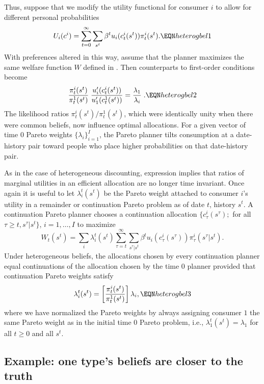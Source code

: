 Thus, suppose that we modify  the utility functional  for consumer $i$
to allow for different personal probabilities
$$ U_i(c^i) = \sum_{t=0}^\infty \sum_{s^t} \beta^t u_i(c^i_t(s^t))
\pi_t^i(s^t) .  \EQN heterogbel1 $$
With preferences altered in this way, assume that the planner
maximizes the same welfare function $W$ defined in .    Then  counterparts to first-order conditions  become
$$ {\frac{\pi_t^i(s^t)}{\pi_t^1(s^t)}} \;
{\frac{u_i^\prime(c^i_t(s^t))}{u_1^\prime(c^1_t(s^t))}}
 = {\frac{\lambda_1}{\lambda_i}} \; .
                                               \EQN heterogbel2 $$
The likelihood ratios $ \pi_t^i(s^t) / \pi_t^1(s^t) $, %
 which were identically unity when there were common beliefs, now influence optimal allocations.
For a given vector of time $0$  Pareto weights $\{\lambda_i\}_{i=1}^I$, the Pareto planner tilts consumption  at a date-history pair toward
people who place higher probabilities on that date-history pair.

As in the case of heterogeneous discounting, expression
 implies that ratios of marginal utilities
in an efficient allocation are no longer time invariant.
Once again it is useful to let $\lambda^t_i(s^t)$ be the
Pareto weight attached to consumer $i$'s utility in a
remainder or continuation Pareto problem as of date $t$, history $s^t$.  A continuation Pareto
planner chooses a continuation allocation
$\{c_{\tau}^i(s^\tau);$ for all $\tau\geq t,s^\tau | s^t\}$,
$i = 1, \ldots , I$  to maximize
$$ W_t(s^t) = \sum_i \lambda^t_i(s^t)
\sum_{\tau = t}^\infty \sum_{s^\tau | s^t}
\beta^t u_i(c_{\tau}^i(s^\tau)) \pi_{\tau}^i(s^\tau | s^t) .$$
Under heterogeneous
beliefs, the allocations chosen by every  continuation  planner  equal  continuations of the allocation chosen by the time $0$ planner provided that
 continuation Pareto weights satisfy
$$
\lambda^t_i(s^t) =  \left[ \pi_t^i(s^t) \over \pi_t^1(s^t) \right]
                    \lambda_i,       \EQN heterogbel3
$$
where we have normalized the Pareto weights
by always assigning consumer $1$ the same Pareto 
weight as in the initial time $0$ Pareto problem, i.e., 
$\lambda^t_1(s^t) = \lambda_1$ for all $t\geq0$ and
all $s^t$.


\subsection{Example: one type's beliefs are closer to the truth}
\label{sec:heterogbel_example}%

